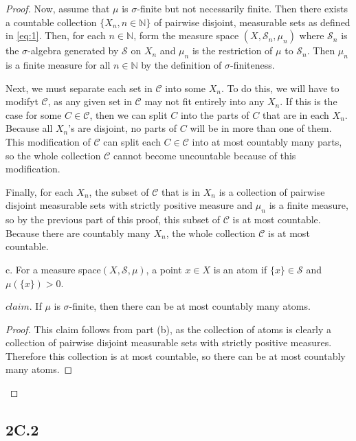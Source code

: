 \documentclass[12pt]{article}
\begin{document}
\begin{itemize}
\begin{proof}
        Now, assume that $\mu$ is $\sigma$-finite but not necessarily finite. Then there exists a countable collection $\{X_n, n \in \mathbb{N}\}$ of pairwise disjoint, measurable sets as defined in \eqref{eq:1}. Then, for each $n \in \mathbb{N}$, form the measure space $(X, \mathcal{S}_n, \mu_n)$ where $\mathcal{S}_n$ is the $\sigma$-algebra generated by $\mathcal{S}$ on $X_n$ and $\mu_n$ is the restriction of $\mu$ to $\mathcal{S}_n$. Then $\mu_n$ is a finite measure for all $n \in \mathbb{N}$ by the definition of $\sigma$-finiteness.

        Next, we must separate each set in $\mathcal{C}$ into some $X_n$. To do this, we will have to modifyt $\mathcal{C}$, as any given set in $\mathcal{C}$ may not fit entirely into any $X_n$. If this is the case for some $C \in \mathcal{C}$, then we can split $C$ into the parts of $C$ that are in each $X_n$. Because all $X_n$'s are disjoint, no parts of $C$ will be in more than one of them. This modification of $\mathcal{C}$ can split each $C \in \mathcal{C}$ into at most countably many parts, so the whole collection $\mathcal{C}$ cannot become uncountable because of this modification.

        Finally, for each $X_n$, the subset of $\mathcal{C}$ that is in $X_n$ is a collection of pairwise disjoint measurable sets with strictly positive measure and $\mu_n$ is a finite measure, so by the previous part of this proof, this subset of $\mathcal{C}$ is at most countable. Because there are countably many $X_n$, the whole collection $\mathcal{C}$ is at most countable.

        \item[c.] For a measure space$(X, \mathcal{S}, \mu)$, a point $x \in X$ is an atom if $\{x\} \in \mathcal{S}$ and $\mu(\{x\}) > 0$.
        
        $claim.$ If $\mu$ is $\sigma$-finite, then there can be at most countably many atoms.

        \begin{proof}
            This claim follows from part (b), as the collection of atoms is clearly a collection of pairwise disjoint measurable sets with strictly positive measures. Therefore this collection is at most countable, so there can be at most countably many atoms.
        \end{proof}
    \end{proof}
\end{itemize}

\subsection*{2C.2}
\end{document}
